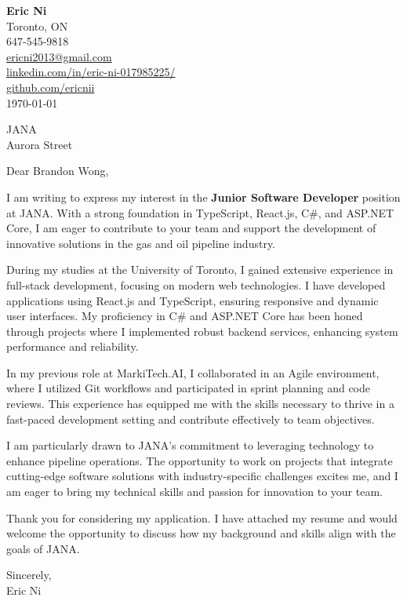 \documentclass[11pt]{letter}
\date{\today}
\begin{document}
\begin{flushleft}
\textbf{Eric Ni} \\
Toronto, ON \\
647-545-9818 \\
\href{mailto:ericni2013@gmail.com}{ericni2013@gmail.com} \\
\href{https://www.linkedin.com/in/eric-ni-017985225/}{linkedin.com/in/eric-ni-017985225/} \\
\href{https://github.com/ericnii}{github.com/ericnii} \\
\vspace{1em}
\today
\end{flushleft}

\vspace{2em}

\begin{flushleft}
JANA \\
Aurora Street
\end{flushleft}

\vspace{1.5em}

\noindent Dear Brandon Wong,

\vspace{1em}

I am writing to express my interest in the \textbf{Junior Software Developer} position at JANA. With a strong foundation in TypeScript, React.js, C\#, and ASP.NET Core, I am eager to contribute to your team and support the development of innovative solutions in the gas and oil pipeline industry.

During my studies at the University of Toronto, I gained extensive experience in full-stack development, focusing on modern web technologies. I have developed applications using React.js and TypeScript, ensuring responsive and dynamic user interfaces. My proficiency in C\# and ASP.NET Core has been honed through projects where I implemented robust backend services, enhancing system performance and reliability.

In my previous role at MarkiTech.AI, I collaborated in an Agile environment, where I utilized Git workflows and participated in sprint planning and code reviews. This experience has equipped me with the skills necessary to thrive in a fast-paced development setting and contribute effectively to team objectives.

I am particularly drawn to JANA's commitment to leveraging technology to enhance pipeline operations. The opportunity to work on projects that integrate cutting-edge software solutions with industry-specific challenges excites me, and I am eager to bring my technical skills and passion for innovation to your team.

Thank you for considering my application. I have attached my resume and would welcome the opportunity to discuss how my background and skills align with the goals of JANA.

\vspace{1.5em}
\noindent Sincerely,\\[0.5em]
\noindent Eric Ni
\end{document}
